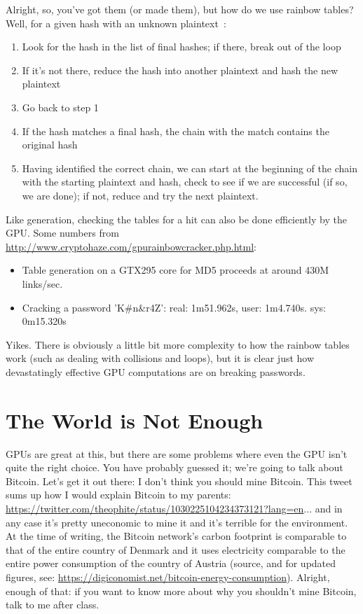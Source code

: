 \documentclass[a4paper]{report}
\begin{document}
Alright, so, you've got them (or made them), but how do we use rainbow tables? Well, for a given hash with an unknown plaintext~\cite{rainbowtables}:
\begin{enumerate}
	\item Look for the hash in the list of final hashes; if there, break out of the loop
	\item If it's not there, reduce the hash into another plaintext and hash the new plaintext
	\item Go back to step 1
	\item If the hash matches a final hash, the chain with the match contains the original hash
	\item Having identified the correct chain, we can start at the beginning of the chain with the starting plaintext and hash, check to see if we are successful (if so, we are done); if not, reduce and try the next plaintext. 
\end{enumerate} 

Like generation, checking the tables for a hit can also be done efficiently by the GPU. Some numbers from \url{http://www.cryptohaze.com/gpurainbowcracker.php.html}: 
\begin{itemize}
	\item Table generation on a GTX295 core for MD5 proceeds at around 430M links/sec.
	\item Cracking a password 'K\#n\&r4Z': real: 1m51.962s, user: 1m4.740s. sys: 0m15.320s
\end{itemize}

Yikes. There is obviously a little bit more complexity to how the rainbow tables work (such as dealing with collisions and loops), but it is clear just how devastatingly effective GPU computations are on breaking passwords.

\section*{The World is Not Enough}
GPUs are great at this, but there are some problems where even the GPU isn't quite the right choice. You have probably guessed it; we're going to talk about Bitcoin. Let's get it out there: I don't think you should mine Bitcoin. This tweet sums up how I would explain Bitcoin to my parents: \url{https://twitter.com/theophite/status/1030225104234373121?lang=en}... and in any case it's pretty uneconomic to mine it and it's terrible for the environment. At the time of writing, the Bitcoin network's carbon footprint is comparable to that of the entire country of Denmark and it uses electricity comparable to the entire power consumption of the country of Austria (source, and for updated figures, see: \url{https://digiconomist.net/bitcoin-energy-consumption}). Alright, enough of that: if you want to know more about why you shouldn't mine Bitcoin, talk to me after class. 
\end{document}
